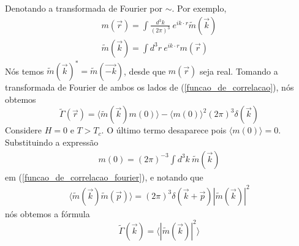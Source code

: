 Denotando a transformada de Fourier por $\sim$. Por exemplo,
\begin{eqnarray}
m(\vec{r})=\int \frac{d^{3}k}{(2 \pi)^{3}} ~ e^{ik \cdot r} \tilde{m}(\vec{k})
\nonumber
\\
\tilde{m}(\vec{k})=\int d^{3}r ~ e^{ik \cdot r} m(\vec{r})
\end{eqnarray}
Nós temos $\tilde{m}(\vec{k})^{\ast}=\tilde{m}(\vec{-k})$, desde que $m(\vec{r})$ seja real. Tomando a transformada de Fourier de ambos os lados de (\ref{funcao_de_correlacao}), nós obtemos
\begin{equation}
\tilde{\Gamma}(\vec{r})=\langle \tilde{m}(\vec{k}) m(0) \rangle- \langle m(0)\rangle^{2} (2 \pi)^{3} \delta(\vec{k})
\label{funcao_de_correlacao_fourier}
\end{equation}
Considere $H=0$ e $T>T_{c}$. O último termo desaparece pois $\langle m(0)\rangle=0$. Substituindo a expressão
\begin{eqnarray*}
m(0)=(2 \pi)^{-3} \int d^{3}k ~ \tilde{m}(\vec{k})
\end{eqnarray*}
em (\ref{funcao_de_correlacao_fourier}), e notando que
\begin{eqnarray*}
\langle \tilde{m}(\vec{k}) \tilde{m}(\vec{p}) \rangle=(2 \pi)^{3} \delta(\vec{k}+\vec{p})|\tilde{m}(\vec{k})|^{2}
\end{eqnarray*}
nós obtemos a fórmula
\begin{equation}
\tilde{\Gamma}(\vec{k})=\langle|\tilde{m}(\vec{k})|^{2}\rangle
\label{gamma_tilde}
\end{equation}


